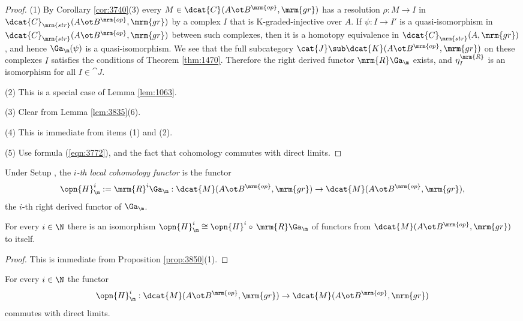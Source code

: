 \begin{proof}
(1) By Corollary \ref{cor:3740}(3) every 
$M \in \dcat{C}_{}(A \ot B^{\mrm{op}}, \mrm{gr})$
has a resolution $\rho : M \to I$ 
in $\dcat{C}_{\mrm{str}}(A \ot B^{\mrm{op}}, \mrm{gr})$
by a complex $I$ that is K-graded-injective over $A$. If 
$\psi : I \to I'$ is a quasi-isomorphism in 
$\dcat{C}_{\mrm{str}}(A \ot B^{\mrm{op}}, \mrm{gr})$ 
between such complexes, 
then it is a homotopy equivalence in 
$\dcat{C}_{\mrm{str}}(A, \mrm{gr})$, 
and hence $\Ga_{\m}(\psi)$ is a quasi-isomorphism. 
We see that the full subcategory 
$\cat{J} \sub \dcat{K}(A \ot B^{\mrm{op}}, \mrm{gr})$
on these complexes $I$ satisfies the conditions of Theorem 
\ref{thm:1470}. Therefore the right derived functor 
$\mrm{R} \Ga_{\m}$ exists, and $\eta^{\mrm{R}}_{I}$ is an isomorphism for 
all $I \in \cat{J}$. 

\medskip \noindent
(2) This is a special case of Lemma \ref{lem:1063}. 

\medskip \noindent
(3) Clear from Lemma \ref{lem:3835}(6). 

\medskip \noindent
(4) This is immediate from items (1) and (2). 

\medskip \noindent
(5) Use formula (\ref{eqn:3772}), and the fact that cohomology commutes with 
direct limits.  
\end{proof}

\begin{dfn} \label{dfn:4045}
Under Setup \tup{\ref{setup:3755}}, the {\em $i$-th local cohomology functor} 
is the functor 
\[ \opn{H}^i_{\m} := \mrm{R}^i \Ga_{\m} : 
\dcat{M}(A \ot B^{\mrm{op}}, \mrm{gr}) \to 
\dcat{M}(A \ot B^{\mrm{op}}, \mrm{gr}) , \]
the $i$-th right derived functor of $\Ga_{\m}$. 
\end{dfn}

\begin{cor} \label{cor:3836}
For every $i \in \N$ there is an isomorphism 
$\opn{H}^i_{\m} \cong \opn{H}^i \circ \, \mrm{R} \Ga_{\m}$
of functors from $\dcat{M}(A  \ot B^{\mrm{op}}, \mrm{gr})$ to itself. 
\end{cor}

\begin{proof}
This is immediate from Proposition \ref{prop:3850}(1). 
\end{proof}

\begin{prop} \label{prop:4050}   
For every $i \in \N$ the functor 
\[ \opn{H}^i_{\m} : \dcat{M}(A \ot B^{\mrm{op}}, \mrm{gr}) \to 
\dcat{M}(A \ot B^{\mrm{op}}, \mrm{gr}) \]
commutes with direct limits. 
\end{prop}

